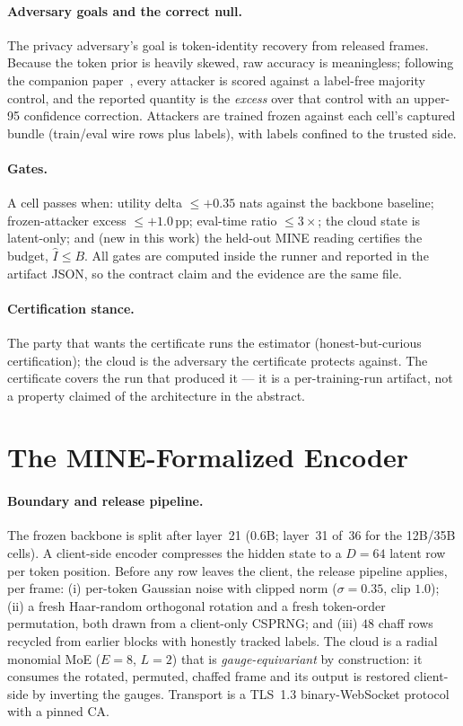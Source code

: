 \documentclass[10pt]{article}
\newcommand{\Ihat}{\hat{I}}
\begin{document}
\paragraph{Adversary goals and the correct null.}
The privacy adversary's goal is token-identity recovery from released
frames.  Because the token prior is heavily skewed, raw accuracy is
meaningless; following the companion paper~\cite{ourswan}, every
attacker is scored against a label-free majority control, and the
reported quantity is the \emph{excess} over that control with an
upper-95 confidence correction.  Attackers are trained frozen against
each cell's captured bundle (train/eval wire rows plus labels), with
labels confined to the trusted side.

\paragraph{Gates.} A cell passes when: utility delta $\le +0.35$ nats
against the backbone baseline; frozen-attacker excess $\le +1.0$\,pp;
eval-time ratio $\le 3\times$; the cloud state is latent-only; and (new
in this work) the held-out MINE reading certifies the budget,
$\Ihat \le B$.  All gates are computed inside the runner and reported in
the artifact JSON, so the contract claim and the evidence are the same
file.

\paragraph{Certification stance.} The party that wants the certificate
runs the estimator (honest-but-curious certification); the cloud is the
adversary the certificate protects against.  The certificate covers the
run that produced it — it is a per-training-run artifact, not a property
claimed of the architecture in the abstract.

\section{The MINE-Formalized Encoder}
\label{sec:method}

\paragraph{Boundary and release pipeline.}
The frozen backbone is split after layer~21 (0.6B; layer~31 of~36 for the
12B/35B cells).  A client-side encoder compresses the hidden state to a
$D{=}64$ latent row per token position.  Before any row leaves the client,
the release pipeline applies, per frame: (i) per-token Gaussian noise with
clipped norm ($\sigma{=}0.35$, clip $1.0$); (ii) a fresh Haar-random
orthogonal rotation and a fresh token-order permutation, both drawn from a
client-only CSPRNG; and (iii) $48$ chaff rows recycled from earlier blocks
with honestly tracked labels.  The cloud is a radial monomial MoE
($E{=}8$, $L{=}2$) that is \emph{gauge-equivariant} by construction: it
consumes the rotated, permuted, chaffed frame and its output is restored
client-side by inverting the gauges.  Transport is a TLS~1.3
binary-WebSocket protocol with a pinned CA.
\end{document}
